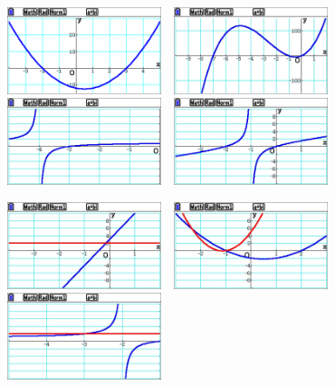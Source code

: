 \documentclass[a4paper,11pt]{article}
\begin{document}
\begin{center}
	\includegraphics[width=4.5cm]{chap03_corr_exo7_a}~~\includegraphics[width=4.5cm]{chap03_corr_exo7_b}~~\includegraphics[width=4.5cm]{chap03_corr_exo7_c}~~\includegraphics[width=4.5cm]{chap03_corr_exo7_d}
\end{center}
\begin{center}
	\includegraphics[width=4.5cm]{chap03_corr_exo7_e}~~\includegraphics[width=4.5cm]{chap03_corr_exo7_f}~~\includegraphics[width=4.5cm]{chap03_corr_exo7_g}
\end{center}
\end{document}
